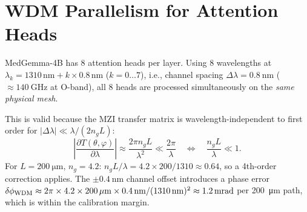\documentclass[12pt, a4paper]{article}
\begin{document}
\section{WDM Parallelism for Attention Heads}
\label{sec:wdm}

MedGemma-4B has 8 attention heads per layer.
Using 8 wavelengths at
$\lambda_k = 1310\,\mathrm{nm} + k \times 0.8\,\mathrm{nm}$ ($k=0\ldots7$),
i.e., channel spacing $\Delta\lambda = \SI{0.8}{\nano\metre}$
($\approx\SI{140}{\giga\hertz}$ at O-band), all 8 heads are processed
simultaneously on the \emph{same physical mesh}.

This is valid because the MZI transfer matrix is wavelength-independent to
first order for $|\Delta\lambda| \ll \lambda / (2 n_g L)$:
\begin{equation}
  \left|\frac{\partial T(\theta,\varphi)}{\partial\lambda}\right|
  \approx \frac{2\pi n_g L}{\lambda^2} \ll \frac{2\pi}{\lambda}
  \quad \Leftrightarrow \quad
  \frac{n_g L}{\lambda} \ll 1.
  \label{eq:wdm_condition}
\end{equation}
For $L = \SI{200}{\micro\metre}$, $n_g = 4.2$:
$n_g L / \lambda = 4.2\times200/1310 \approx 0.64$,
so a 4th-order correction applies.
The $\pm\SI{0.4}{\nano\metre}$ channel offset introduces a phase error
$\delta\phi_{\rm WDM} \approx 2\pi \times 4.2 \times 200\,\mu\mathrm{m}
 \times 0.4\,\mathrm{nm} / (1310\,\mathrm{nm})^2 \approx 1.2\,\mathrm{mrad}$
per \SI{200}{\micro\metre} path, which is within the calibration margin.
\end{document}
